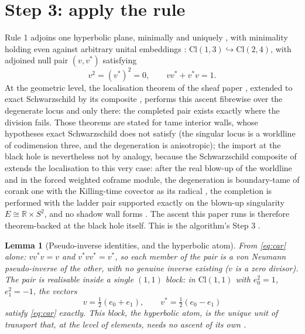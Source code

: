 \documentclass[11pt]{article}
\newtheorem{lemma}[theorem]{Lemma}
\theoremstyle{definition}
\newcommand{\Cl}{\mathrm{Cl}}
\newcommand{\R}{\mathbb{R}}
\begin{document}
\section{Step 3: apply the rule}\label{sec:ascent}

Rule 1 adjoins one hyperbolic plane, minimally and uniquely \cite[Thms.~4.10, 4.13]{ButlerT1}, with minimality holding even against arbitrary unital embeddings \cite[Thm.~4.19]{ButlerT1}: $\Cl(1,3) \hookrightarrow \Cl(2,4)$, with adjoined null pair $(v, v^*)$ satisfying
\begin{equation}\label{eq:car}
v^2 = (v^*)^2 = 0, \qquad v v^* + v^* v = 1 . \tag{CAR}
\end{equation}
At the geometric level, the localisation theorem of the sheaf paper \cite[Thm.~4.4, Cor.~4.5]{ButlerT4}, extended to exact Schwarzschild by its composite \cite[Thms 8.7, 8.12]{ButlerT4}, performs this ascent fibrewise over the degenerate locus and only there: the completed pair exists exactly where the division fails. Those theorems are stated for tame interior walls, whose hypotheses exact Schwarzschild does not satisfy (the singular locus is a worldline of codimension three, and the degeneration is anisotropic); the import at the black hole is nevertheless not by analogy, because the Schwarzschild composite of \cite[\S 8]{ButlerT4} extends the localisation to this very case: after the real blow-up of the worldline and in the forced weighted coframe module, the degeneration is boundary-tame of corank one with the Killing-time covector as its radical \cite[Thm.~8.7]{ButlerT4}, the completion is performed with the ladder pair supported exactly on the blown-up singularity $E \cong \R \times S^2$, and no shadow wall forms \cite[Thm.~8.12]{ButlerT4}. The ascent this paper runs is therefore theorem-backed at the black hole itself. This is the algorithm's Step 3 \cite[\S 8.1, Step 3]{ButlerT1}.

\begin{lemma}[Pseudo-inverse identities, and the hyperbolic atom]\label{lem:atom}
From \eqref{eq:car} alone: $v v^* v = v$ and $v^* v v^* = v^*$, so each member of the pair is a von Neumann pseudo-inverse of the other, with no genuine inverse existing ($v$ is a zero divisor). The pair is realisable inside a single $(1,1)$ block: in $\Cl(1,1)$ with $e_0^2 = 1$, $e_1^2 = -1$, the vectors
\[
v = \tfrac12(e_0 + e_1), \qquad v^* = \tfrac12(e_0 - e_1)
\]
satisfy \eqref{eq:car} exactly. This block, the \emph{hyperbolic atom}, is the unique unit of transport that, at the level of elements, needs no ascent of its own \cite[Rem.~4.5]{ButlerT1}.
\end{lemma}
\end{document}
